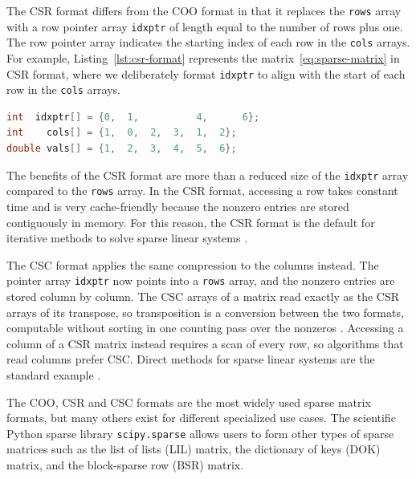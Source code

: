 The CSR format differs from the \ac{COO} format in that it replaces the \texttt{rows} array with
a row pointer array \texttt{idxptr} of length equal to the number of rows plus one.
The row pointer array indicates the starting index of each row in the \texttt{cols} arrays.
For example, Listing~\ref{lst:csr-format} represents the matrix~\eqref{eq:sparse-matrix} in
CSR format, where we deliberately format \texttt{idxptr} to align with the start of each
row in the \texttt{cols} arrays.
\begin{lstlisting}[language=C, caption={The matrix~\eqref{eq:sparse-matrix} in CSR
format.}, label=lst:csr-format]
int  idxptr[] = {0,  1,          4,      6};
int    cols[] = {1,  0,  2,  3,  1,  2};
double vals[] = {1,  2,  3,  4,  5,  6};
\end{lstlisting}
The benefits of the CSR format are more than a reduced size of the \texttt{idxptr} array
compared to the \texttt{rows} array.
In the CSR format, accessing a row takes constant time and is very cache-friendly
because the nonzero entries are stored contiguously in memory.
For this reason, the CSR format is the default for iterative methods
to solve sparse linear systems \cite{saad2003iterative}.

The \ac{CSC} format applies the same compression to the
columns instead.
The pointer array \texttt{idxptr} now points into a \texttt{rows} array, and the nonzero
entries are stored column by column.
The CSC arrays of a matrix read exactly as the CSR arrays of its transpose, so transposition
is a conversion between the two formats, computable without sorting in one counting pass over
the nonzeros \cite{gustavson1978two}.
Accessing a column of a CSR matrix instead requires a scan of every row, so algorithms
that read columns prefer CSC. Direct methods for sparse linear systems are the
standard example \cite{davis2006direct}.

The \ac{COO}, CSR and CSC formats are the most widely used sparse matrix formats,
but many others exist for different specialized use cases.
The scientific Python sparse library \texttt{scipy.sparse} \cite{2020SciPy-NMeth}
allows users to form other types of sparse matrices such as the list of lists (LIL) matrix,
the dictionary of keys (DOK) matrix, and the block-sparse row (BSR) matrix.

